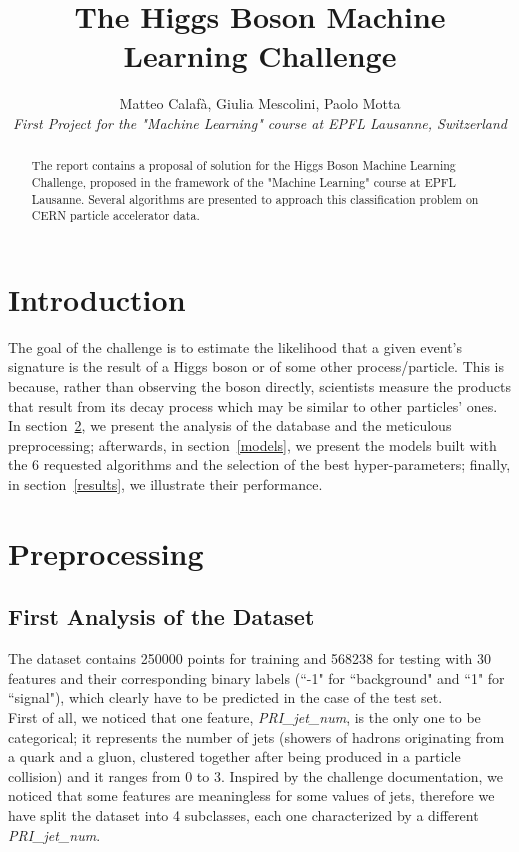 \documentclass[10pt,conference,compsocconf]{IEEEtran}
\begin{document}
\title{The Higgs Boson Machine Learning Challenge}

\author{
  Matteo Calafà, Giulia Mescolini, Paolo Motta\\
  \textit{First Project for the "Machine Learning" course at EPFL Lausanne, Switzerland}
}

\maketitle

\begin{abstract}
 The report contains a proposal of solution for the Higgs Boson Machine Learning Challenge, proposed in the framework of the "Machine Learning" course at EPFL Lausanne. Several algorithms are presented to approach this classification problem on CERN particle accelerator data.
\end{abstract}

\section{Introduction}

The goal of the challenge is to estimate the likelihood that a given event's signature is the result of a Higgs boson or of some other process/particle. This is because, rather than observing the boson directly, scientists measure the products that result from its decay process which may be similar to other particles' ones. \\
In section~\ref{preprocessing}, we present the analysis of the database and the meticulous preprocessing; afterwards, in section~\ref{models}, we present the models built with the 6 requested algorithms and the selection of the best hyper-parameters; finally, in section~\ref{results}, we illustrate their performance.

\section{Preprocessing}
\label{preprocessing}

\subsection{First Analysis of the Dataset}
\label{categorical}
The dataset contains 250000 points for training and 568238 for testing with 30 features and their corresponding binary labels (``-1" for ``background" and ``1" for ``signal"), which clearly have to be predicted in the case of the test set. \\
First of all, we noticed that one feature, \emph{PRI\_jet\_num}, is the only one to be categorical; it represents the number of jets (showers of hadrons originating from a quark and a gluon, clustered together after being produced in a particle collision) and it ranges from 0 to 3. Inspired by the challenge documentation, we noticed that some features are meaningless for some values of jets, therefore we have split the dataset into 4 subclasses, each one characterized by a different \emph{PRI\_jet\_num}.
\end{document}
